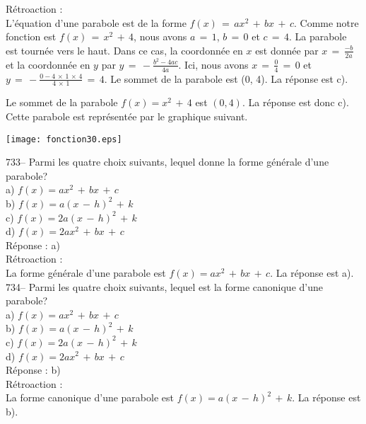 ﻿\documentclass[letterpaper, 12pt]{article}
\begin{document}
R\'etroaction : \\
L'\'equation d'une parabole est de la forme
$f(x)\,=\,ax^2\,+\,bx\,+\,c$. Comme notre fonction est
$f(x)\,=\,x^2\,+\,4$, nous avons $a\,=\,1$, $b\,=\,0$ et $c\,=\,4$.
La parabole est tourn\'ee vers le haut. Dans ce cas, la coordonn\'ee
en $x$ est donn\'ee par $x\,=\, \frac{-b}{2a}$ et la coordonn\'ee en
$y$ par $y\,=\, -\frac{b^2-4ac}{4a}$. Ici, nous avons
$x\,=\,\frac{0}{4}\,=\,0$ et
$y\,=\,-\frac{0-4\,\times\,1\,\times\,4}{4\,\times\,1}\,=\,4$. Le
sommet de la parabole est (0, 4). La r\'eponse est c).


Le sommet de la parabole $f\left( x\right) =x^{2}\,+\,4$ est $(0,4)$.  La
r\'eponse est donc c).  Cette parabole est repr\'esent\'ee par le graphique
suivant.\\
    \begin{center}
    \texttt{[image: fonction30.eps]}
    \end{center}

733-- Parmi les quatre choix suivants, lequel donne la forme g\'en\'erale
d'une parabole?\\
a) $f(x)=ax^{2}\,+\,bx\,+\,c$\\
b) $f(x)=a(x\,-\,h)^{2}\,+\,k$\\
c) $f(x)=2a(x\,-\,h)^{2}\,+\,k$\\
d) $f(x)=2ax^{2}\,+\,bx\,+\,c$\\

R\'eponse : a)\\

R\'etroaction : \\
La forme g\'en\'erale d'une parabole est $f(x)=ax^{2}\,+\,bx\,+\,c$.  La
r\'eponse est a).\\

734-- Parmi les quatre choix suivants, lequel est la forme canonique d'une
parabole?\\
a) $f(x)=ax^{2}\,+\,bx\,+\,c$\\
b) $f(x)=a(x\,-\,h)^{2}\,+\,k$\\
c) $f(x)=2a(x\,-\,h)^{2}\,+\,k$\\
d) $f(x)=2ax^{2}\,+\,bx\,+\,c$\\

R\'eponse : b)\\

R\'etroaction : \\
La forme canonique d'une parabole est $f(x)=a(x\,-\,h)^{2}\,+\,k$.  La
r\'eponse est b).\\
\end{document}

